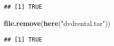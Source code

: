 \documentclass[]{book}
\newenvironment{Shaded}{\begin{snugshade}}{\end{snugshade}}
\newcommand{\KeywordTok}[1]{\textcolor[rgb]{0.13,0.29,0.53}{\textbf{#1}}}
\newcommand{\NormalTok}[1]{#1}
\newcommand{\StringTok}[1]{\textcolor[rgb]{0.31,0.60,0.02}{#1}}
\theoremstyle{definition}
\theoremstyle{definition}
\theoremstyle{definition}
\theoremstyle{remark}
\begin{document}
\begin{verbatim}
## [1] TRUE
\end{verbatim}

\begin{Shaded}
\begin{Highlighting}[]
\KeywordTok{file.remove}\NormalTok{(}\KeywordTok{here}\NormalTok{(}\StringTok{"dvdrental.tar"}\NormalTok{))}
\end{Highlighting}
\end{Shaded}

\begin{verbatim}
## [1] TRUE
\end{verbatim}


\end{document}
